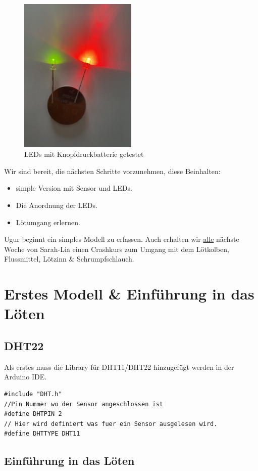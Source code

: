 \documentclass[12pt]{article}
\begin{document}
\begin{figure}[H]
\begin{center}
\includegraphics[width=0.5\textwidth]{pics/leds.jpeg}
\caption{LEDs mit Knopfdruckbatterie getestet}
\label{Fig:leds}
\end{center}
\end{figure}\par
Wir sind bereit, die nächsten Schritte vorzunehmen, diese Beinhalten: 
\begin{itemize}
\item simple Version mit Sensor und LEDs.
\item Die Anordnung der LEDs.
\item Lötumgang erlernen.
\end{itemize} Ugur beginnt ein simples Modell zu erfassen. Auch erhalten wir \underline{alle} nächste Woche von Sarah-Lia einen Crashkurs zum Umgang mit dem Lötkolben, Flussmittel, Lötzinn \& Schrumpfschlauch.
\section{Erstes Modell \& Einführung in das Löten}
\subsection{DHT22}
Als erstes muss die Library für DHT11/DHT22 hinzugefügt werden in der Arduino IDE. 
\begin{lstlisting}
#include "DHT.h" 
//Pin Nummer wo der Sensor angeschlossen ist               
#define DHTPIN 2
// Hier wird definiert was fuer ein Sensor ausgelesen wird.
#define DHTTYPE DHT11
\end{lstlisting}
\subsection{Einführung in das Löten}
\end{document}
